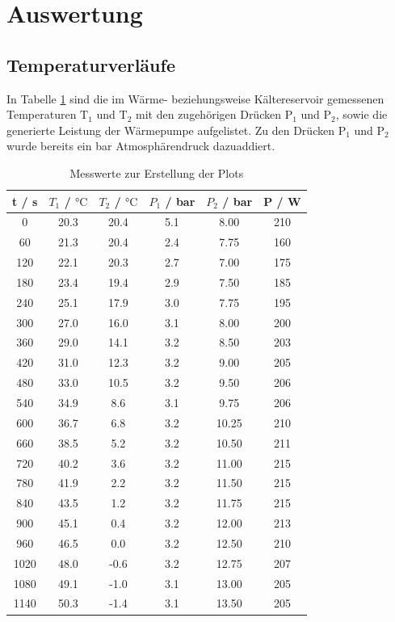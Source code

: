 \section{Auswertung}
\subsection{Temperaturverläufe}
In Tabelle \ref{tab1} sind die im Wärme- beziehungsweise Kältereservoir gemessenen Temperaturen
$\text{T}_1$ und $\text{T}_2$ mit den zugehörigen Drücken $\text{P}_1$ und $\text{P}_2$, sowie
die generierte Leistung der Wärmepumpe aufgelistet. Zu den Drücken $\text{P}_1$ und $\text{P}_2$
wurde bereits ein bar Atmosphärendruck dazuaddiert.
\FloatBarrier
\begin{table}
  \centering
  \caption{Messwerte zur Erstellung der Plots}
  \label{tab1}
  \begin{tabular}{ c c c c c c }
    \toprule
    {t / s} & {$T_1$ / $\si{\celsius}$} & {$T_2$ / $\si{\celsius}$} & {$P_1$ / bar} & {$P_2$ / bar} & {P / W} \\
    \midrule
     0  &   20.3   &   20.4  &  5.1  &  8.00   &  210  \\
    60  &   21.3   &   20.4  &  2.4  &  7.75   &  160  \\
   120  &   22.1   &   20.3  &  2.7  &  7.00   &  175  \\
   180  &   23.4   &   19.4  &  2.9  &  7.50   &  185  \\
   240  &   25.1   &   17.9  &  3.0  &  7.75   &  195  \\
   300  &   27.0   &   16.0  &  3.1  &  8.00   &  200  \\
   360  &   29.0   &   14.1  &  3.2  &  8.50   &  203  \\
   420  &   31.0   &   12.3  &  3.2  &  9.00   &  205  \\
   480  &   33.0   &   10.5  &  3.2  &  9.50   &  206  \\
   540  &   34.9   &    8.6  &  3.1  &  9.75   &  206  \\
   600  &   36.7   &    6.8  &  3.2  &  10.25  &  210  \\
   660  &   38.5   &    5.2  &  3.2  &  10.50  &  211  \\
   720  &   40.2   &    3.6  &  3.2  &  11.00  &  215  \\
   780  &   41.9   &    2.2  &  3.2  &  11.50  &  215  \\
   840  &   43.5   &    1.2  &  3.2  &  11.75  &  215  \\
   900  &   45.1   &    0.4  &  3.2  &  12.00  &  213  \\
   960  &   46.5   &    0.0  &  3.2  &  12.50  &  210  \\
   1020 &   48.0   &   -0.6  &  3.2  &  12.75  &  207  \\
   1080 &   49.1   &   -1.0  &  3.1  &  13.00  &  205  \\
   1140 &   50.3   &   -1.4  &  3.1  &  13.50  &  205  \\
   \bottomrule
 \end{tabular}
\end{table}

